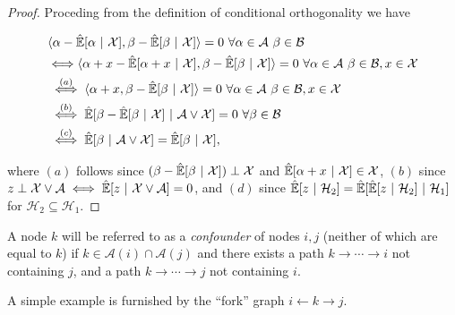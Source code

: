 \documentclass[12pt]{article}
\def\H{\mathcal{H}}  %
\newcommand{\linE}[2]{\hat{\E}[#1\ |\ #2]}  %
\newcommand{\anc}[1]{\mathcal{A}(#1)}  %
\newcommand{\gcgpath}[2]{#1 \rightarrow \cdots \rightarrow #2}  %
\begin{document}
\begin{proof}
  Proceding from the definition of conditional orthogonality we have

  \begin{align*}
    &\inner{\alpha - \linE{\alpha}{\mathcal{X}}}{\beta - \linE{\beta}{\mathcal{X}}} = 0 \ \forall \alpha \in \mathcal{A}\ \beta \in \mathcal{B}\\
    &{\iff} \inner{\alpha + x - \linE{\alpha + x}{\mathcal{X}}}{\beta - \linE{\beta}{\mathcal{X}}} = 0 \ \forall \alpha \in \mathcal{A}\ \beta \in \mathcal{B}, x \in \mathcal{X}\\
    &\overset{(a)}{\iff} \inner{\alpha + x}{\beta - \linE{\beta}{\mathcal{X}}} = 0 \ \forall \alpha \in \mathcal{A}\ \beta \in \mathcal{B}, x \in \mathcal{X}\\
    &\overset{(b)}{\iff} \linE{\beta - \linE{\beta}{\mathcal{X}}}{\mathcal{A} \vee \mathcal{X}} = 0\ \forall \beta \in \mathcal{B}\\
    &\overset{(c)}{\iff} \linE{\beta}{\mathcal{A} \vee \mathcal{X}} = \linE{\beta}{\mathcal{X}},
  \end{align*}

  where $(a)$ follows since $(\beta - \linE{\beta}{\mathcal{X}}) \perp \mathcal{X}$ and $\linE{\alpha + x}{\mathcal{X}} \in \mathcal{X}$, $(b)$ since $z \perp \mathcal{X} \vee \mathcal{A} \iff \linE{z}{\mathcal{X} \vee \mathcal{A}} = 0$, and $(d)$ since $\linE{z}{\H_2} = \linE{\linE{z}{\H_2}}{\H_1}$ for $\H_2 \subseteq \H_1$.
  

\end{proof}

\begin{definition}[\hl{Confounder}]
  A node $k$ will be referred to as a \textit{confounder} of nodes
  $i, j$ (neither of which are equal to $k$) if
  $k \in \anc{i} \cap \anc{j}$ and there exists a path
  $\gcgpath{k}{i}$ not containing $j$, and a path $\gcgpath{k}{j}$
  not containing $i$.

  A simple example is furnished by the ``fork'' graph
  $i \leftarrow k \rightarrow j$.
\end{definition}
\end{document}

